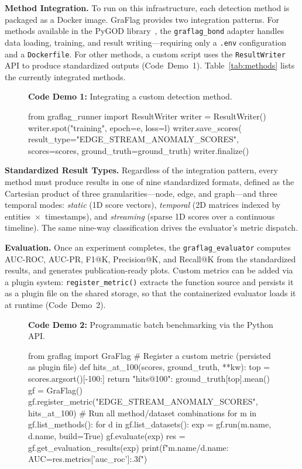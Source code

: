 \documentclass[twoside,11pt]{article}
\begin{document}
\textbf{Method Integration.} To run on this infrastructure, each detection method is packaged as a Docker image. GraFlag provides two integration patterns. For methods available in the PyGOD library~\citep{liu2024pygod}, the \texttt{graflag\_bond} adapter handles data loading, training, and result writing---requiring only a \texttt{.env} configuration and a \texttt{Dockerfile}. For other methods, a custom script uses the \texttt{ResultWriter} API to produce standardized outputs (Code~Demo~1). Table~\ref{tab:methods} lists the currently integrated methods.

\begin{figure}[!ht]
\small\textbf{Code Demo 1:} Integrating a custom detection method.
\begin{pycode}
from graflag_runner import ResultWriter
writer = ResultWriter()
writer.spot("training", epoch=e, loss=l)
writer.save_scores(
    result_type="EDGE_STREAM_ANOMALY_SCORES",
    scores=scores, ground_truth=ground_truth)
writer.finalize()
\end{pycode}
\end{figure}

\textbf{Standardized Result Types.} Regardless of the integration pattern, every method must produce results in one of nine standardized formats, defined as the Cartesian product of three granularities---node, edge, and graph---and three temporal modes: \emph{static} (1D score vectors), \emph{temporal} (2D matrices indexed by entities~$\times$~timestamps), and \emph{streaming} (sparse 1D scores over a continuous timeline). The same nine-way classification drives the evaluator's metric dispatch.

\textbf{Evaluation.} Once an experiment completes, the \texttt{graflag\_evaluator} computes AUC-ROC, AUC-PR, F1@K, Precision@K, and Recall@K from the standardized results, and generates publication-ready plots. Custom metrics can be added via a plugin system: \texttt{register\_metric()} extracts the function source and persists it as a plugin file on the shared storage, so that the containerized evaluator loads it at runtime (Code~Demo~2).

\begin{figure}[!ht]
\small\textbf{Code Demo 2:} Programmatic batch benchmarking via the Python API.
\begin{pycode}
from graflag import GraFlag
# Register a custom metric (persisted as plugin file)
def hits_at_100(scores, ground_truth, **kw):
    top = scores.argsort()[-100:]
    return {"hits@100": ground_truth[top].mean()}
gf = GraFlag()
gf.register_metric("EDGE_STREAM_ANOMALY_SCORES", hits_at_100)
# Run all method/dataset combinations
for m in gf.list_methods():
    for d in gf.list_datasets():
        exp = gf.run(m.name, d.name, build=True)
        gf.evaluate(exp)
        res = gf.get_evaluation_results(exp)
        print(f"{m.name}/{d.name}: AUC={res.metrics['auc_roc']:.3f}")
\end{pycode}
\end{figure}
\end{document}
